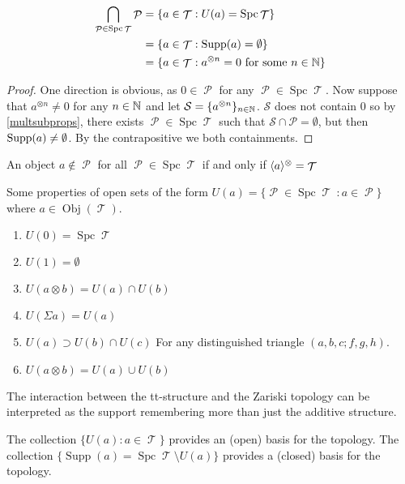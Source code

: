 \documentclass[11pt]{article}
\DeclareMathOperator{\ob}{Obj}
\DeclareMathOperator{\TT}{\mathcal{T}}
\DeclareMathOperator{\cP}{\mathcal{P}}
\DeclareMathOperator{\supp}{Supp}
\DeclareMathOperator{\spc}{Spc}
\begin{document}
\begin{cor}
	\begin{align*}
		\bigcap_{\cP \in \spc \TT} \cP &= \{a \in \TT: U(a) = \spc \TT\}\\
				&= \{a \in \TT: \Supp(a) = \emptyset\}\\
				&= \{a \in \TT: a^{\otimes n} = 0 \text{ for some } n \in \N\}
	\end{align*}
\end{cor}
\begin{proof}
One direction is obvious, as $0 \in \cP$ for any $\cP \in \spc \TT$. Now suppose that $a^{\otimes n} \not = 0$ for any $n \in \mathbb N$ and let $\mathcal{S} = \{a^{\otimes n}\}_{n \in \mathbb N}$. $\mathcal{S}$ does not contain $0$ so by \autoref{multsubprops}, there exists $\cP \in \spc \TT$ such that $\mathcal{S} \cap \mathcal{P} = \emptyset$, but then $\operatorname{Supp}(a) \not = \emptyset$. By the contrapositive we both containments.
\end{proof}

\begin{cor} An object $a \not\in \cP$ for all $\cP \in \spc \TT$ if and only if $\la a \ra^{\otimes} = \TT$

\end{cor}

\begin{prop}\label{prop:UProperties} Some properties of open sets of the form $U(a) = \{\cP \in \spc\TT \ : a \in \cP\}$ where $a \in \ob(\TT)$.
\begin{enumerate}
    \item $U(0) = \spc\TT$
    \item $U(1) = \emptyset$
    \item $U(a\otimes b) = U(a) \cap U(b)$
    \item $U(\Sigma a) = U(a)$
    \item $U(a) \supset U(b) \cap U(c)$ For any distinguished triangle $(a,b,c; f,g,h)$.
    \item $U(a\otimes b) = U(a) \cup U(b)$
\end{enumerate}
\end{prop}

\begin{rmk} The interaction between the tt-structure and the Zariski topology can be interpreted as the support remembering more than just the additive structure.
\end{rmk}

\begin{cor}\label{cor:basis} The collection $\{U(a):a \in \TT\}$ provides an (open) basis for the topology. The collection $\{\supp(a) = \spc\TT\setminus U(a)\}$ provides a (closed) basis for the topology.
\end{cor}
\end{document}
